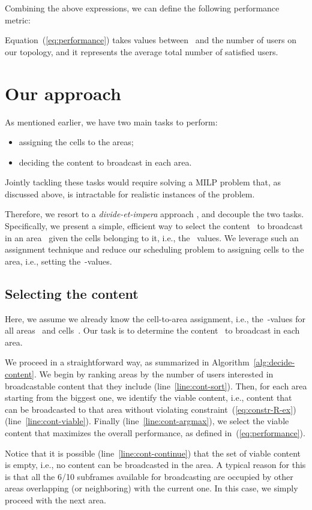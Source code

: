 \documentclass[10pt, conference, compsocconf]{IEEEtran}
\numberwithin{equation}{section}
\begin{document}
Combining the above expressions, we can define the following
performance metric:

Equation~(\ref{eq:performance}) takes values between~ and the
number of users on our topology, and it represents the average total number
of satisfied users.



\section{Our approach
\label{sec:algos}
}
As mentioned earlier, we have two main tasks to perform:
\begin{itemize}
\item assigning the cells to the areas;
\item deciding the content to broadcast in each area.
\end{itemize}
Jointly tackling these tasks would require solving a MILP problem that, as discussed above,
is intractable for realistic instances of the problem.

Therefore, we resort to a {\em divide-et-impera} approach \cite{MILCOM}, and decouple the two tasks.
Specifically, we present a simple, efficient way to select the
content~ to broadcast in an area~
given the cells belonging to it, i.e., the~ values. We leverage
such an assignment technique and reduce our scheduling problem to assigning
cells to the area, i.e., setting the~-values.

\subsection{Selecting the content}

Here, we assume we already know the cell-to-area assignment, i.e., the~-values
for all areas~ and cells~.
Our task is to determine the content~ to broadcast in each area.

We proceed in a straightforward way, as summarized in Algorithm~\ref{alg:decide-content}.
We begin by ranking areas by the number of users interested in
broadcastable content that they  include (line~\ref{line:cont-sort}).
Then, for each area starting from the biggest one, 
we identify the viable content, i.e., content that can be broadcasted to that area
without violating constraint~(\ref{eq:constr-R-ex}) (line~\ref{line:cont-viable}).
Finally (line~\ref{line:cont-argmax}), we select the viable content that maximizes
the overall performance, as defined in~(\ref{eq:performance}).

Notice that it is possible (line~\ref{line:cont-continue}) that the set of viable
content is empty, i.e., no content can be broadcasted in the area. A typical reason
for this is that all the 6/10 subframes available for broadcasting are occupied by other
areas overlapping (or neighboring) with the current one. In this case, we simply
proceed with the next area.
\end{document}
